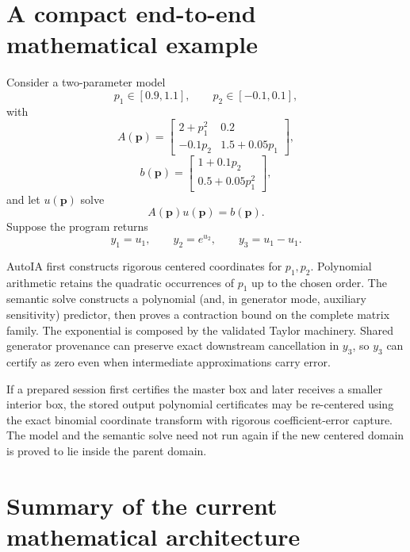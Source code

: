 \documentclass[11pt]{article}
\newcommand{\pv}{\mathbf{p}}
\begin{document}
\section{A compact end-to-end mathematical example}

Consider a two-parameter model
\[
  p_1\in[0.9,1.1],
  \qquad
  p_2\in[-0.1,0.1],
\]
with
\[
  A(\pv)=
  \begin{bmatrix}
  2+p_1^2 & 0.2\\
  -0.1p_2 & 1.5+0.05p_1
  \end{bmatrix},
\]
\[
  b(\pv)=
  \begin{bmatrix}
  1+0.1p_2\\
  0.5+0.05p_1^2
  \end{bmatrix},
\]
and let \(u(\pv)\) solve
\[
  A(\pv)u(\pv)=b(\pv).
\]
Suppose the program returns
\[
  y_1=u_1,
  \qquad
  y_2=e^{u_2},
  \qquad
  y_3=u_1-u_1.
\]

AutoIA first constructs rigorous centered coordinates for \(p_1,p_2\).  Polynomial
arithmetic retains the quadratic occurrences of \(p_1\) up to the chosen order.
The semantic solve constructs a polynomial (and, in generator mode, auxiliary
sensitivity) predictor, then proves a contraction bound on the complete matrix
family.  The exponential is composed by the validated Taylor machinery.  Shared
generator provenance can preserve exact downstream cancellation in \(y_3\), so
\(y_3\) can certify as zero even when intermediate approximations carry error.

If a prepared session first certifies the master box and later receives a smaller
interior box, the stored output polynomial certificates may be re-centered using
the exact binomial coordinate transform with rigorous coefficient-error capture.
The model and the semantic solve need not run again if the new centered domain is
proved to lie inside the parent domain.

\section{Summary of the current mathematical architecture}
\end{document}
